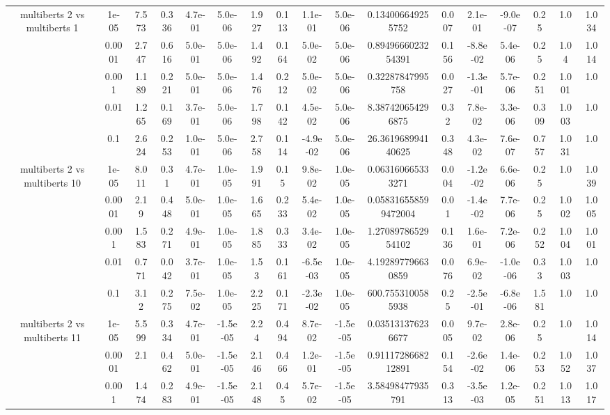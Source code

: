 \begin{tabular}{|c|c|c|c|c|c|c|c|c|c|c|c|c|c|c|c|c|}
\hline
\multirow{5}{*}{multiberts 2 vs multiberts 1} & 1e-05 & 7.573 & 0.336 & 4.7e-01 & 5.0e-06 & 1.927 & 0.113 & 1.1e-01 & 5.0e-06 & 0.134006649255752 & 0.007 & 2.1e-01 & -9.0e-07 & 0.25 & 1.0 & 1.034 \\
 & 0.0001 & 2.747 & 0.616 & 5.0e-01 & 5.0e-06 & 1.492 & 0.164 & 5.0e-02 & 5.0e-06 & 0.8949666023254391 & 0.156 & -8.8e-02 & 5.4e-06 & 0.25 & 1.04 & 1.014 \\
 & 0.001 & 1.189 & 0.221 & 5.0e-01 & 5.0e-06 & 1.476 & 0.212 & 5.0e-02 & 5.0e-06 & 0.32287847995758 & 0.027 & -1.3e-01 & 5.7e-06 & 0.251 & 1.001 & 1.0 \\
 & 0.01 & 1.265 & 0.169 & 3.7e-01 & 5.0e-06 & 1.798 & 0.142 & 4.5e-02 & 5.0e-06 & 8.387420654296875 & 0.32 & 7.8e-02 & 3.3e-06 & 0.309 & 1.003 & 1.0 \\
 & 0.1 & 2.624 & 0.253 & 1.0e-01 & 5.0e-06 & 2.758 & 0.114 & -4.9e-02 & 5.0e-06 & 26.361968994140625 & 0.348 & 4.3e-02 & 7.6e-07 & 0.757 & 1.031 & 1.0 \\
\hline
\multirow{5}{*}{multiberts 2 vs multiberts 10} & 1e-05 & 8.011 & 0.31 & 4.7e-01 & 1.0e-05 & 1.991 & 0.15 & 9.8e-02 & 1.0e-05 & 0.063160665333271 & 0.004 & -1.2e-02 & 6.6e-06 & 0.25 & 1.0 & 1.039 \\
 & 0.0001 & 2.19 & 0.448 & 5.0e-01 & 1.0e-05 & 1.665 & 0.233 & 5.4e-02 & 1.0e-05 & 0.058316558599472004 & 0.01 & -1.4e-02 & 7.7e-06 & 0.25 & 1.002 & 1.005 \\
 & 0.001 & 1.583 & 0.271 & 4.9e-01 & 1.0e-05 & 1.885 & 0.333 & 3.4e-02 & 1.0e-05 & 1.2708978652954102 & 0.136 & 1.6e-01 & 7.2e-06 & 0.252 & 1.004 & 1.001 \\
 & 0.01 & 0.771 & 0.042 & 3.7e-01 & 1.0e-05 & 1.53 & 0.161 & -6.5e-03 & 1.0e-05 & 4.192897796630859 & 0.076 & 6.9e-02 & -1.0e-06 & 0.33 & 1.003 & 1.0 \\
 & 0.1 & 3.12 & 0.275 & 7.5e-02 & 1.0e-05 & 2.225 & 0.171 & -2.3e-02 & 1.0e-05 & 600.7553100585938 & 0.25 & -2.5e-01 & -6.8e-06 & 1.581 & 1.0 & 1.0 \\
\hline
\multirow{5}{*}{multiberts 2 vs multiberts 11} & 1e-05 & 5.599 & 0.334 & 4.7e-01 & -1.5e-05 & 2.24 & 0.494 & 8.7e-02 & -1.5e-05 & 0.035131376236677 & 0.005 & 9.7e-02 & 2.8e-06 & 0.25 & 1.0 & 1.014 \\
 & 0.0001 & 2.1 & 0.462 & 5.0e-01 & -1.5e-05 & 2.146 & 0.466 & 1.2e-01 & -1.5e-05 & 0.9111728668212891 & 0.154 & -2.6e-02 & 1.4e-06 & 0.253 & 1.052 & 1.037 \\
 & 0.001 & 1.474 & 0.283 & 4.9e-01 & -1.5e-05 & 2.148 & 0.45 & 5.7e-02 & -1.5e-05 & 3.58498477935791 & 0.313 & -3.5e-03 & 1.2e-05 & 0.251 & 1.013 & 1.017 \\

\end{tabular}
